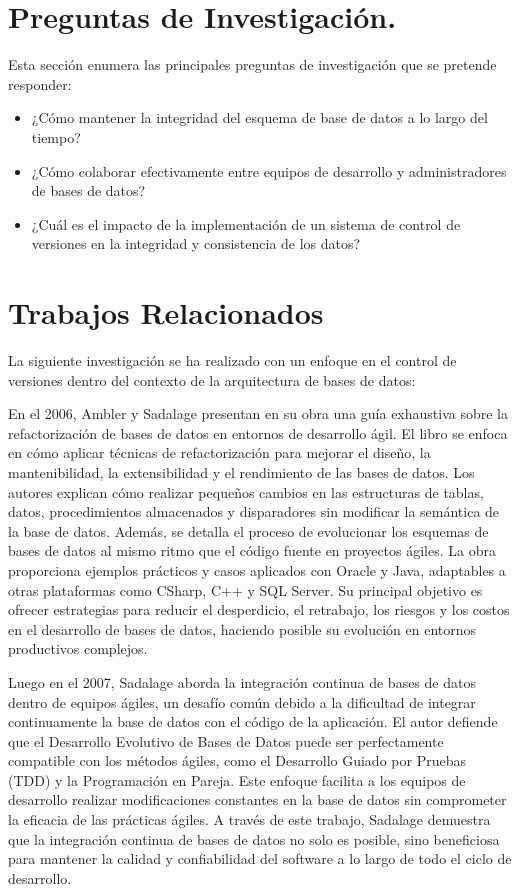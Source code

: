 \documentclass{IEEEtran}
\begin{document}
\section{Preguntas de Investigación.}
Esta sección enumera las principales preguntas de investigación que se pretende responder:
\begin{itemize}
    \item ¿Cómo mantener la integridad del esquema de base de datos a lo largo del tiempo? 
    \item ¿Cómo colaborar efectivamente entre equipos de desarrollo y administradores de bases de datos? 
    \item ¿Cuál es el impacto de la implementación de un sistema de control de versiones en la integridad y consistencia de los datos?
\end{itemize}


\section{Trabajos Relacionados}
La siguiente investigación se ha realizado con un enfoque en el control de versiones dentro del contexto de la arquitectura de bases de datos:

En el 2006, Ambler y Sadalage \cite{ambler2006refactoring} presentan en su obra una guía exhaustiva sobre la refactorización de bases de datos en entornos de desarrollo ágil. El libro se enfoca en cómo aplicar técnicas de refactorización para mejorar el diseño, la mantenibilidad, la extensibilidad y el rendimiento de las bases de datos. Los autores explican cómo realizar pequeños cambios en las estructuras de tablas, datos, procedimientos almacenados y disparadores sin modificar la semántica de la base de datos. Además, se detalla el proceso de evolucionar los esquemas de bases de datos al mismo ritmo que el código fuente en proyectos ágiles. La obra proporciona ejemplos prácticos y casos aplicados con Oracle y Java, adaptables a otras plataformas como CSharp, C++ y SQL Server. Su principal objetivo es ofrecer estrategias para reducir el desperdicio, el retrabajo, los riesgos y los costos en el desarrollo de bases de datos, haciendo posible su evolución en entornos productivos complejos.

Luego en el 2007, Sadalage \cite{sadalage2007recipes} aborda la integración continua de bases de datos dentro de equipos ágiles, un desafío común debido a la dificultad de integrar continuamente la base de datos con el código de la aplicación. El autor defiende que el Desarrollo Evolutivo de Bases de Datos puede ser perfectamente compatible con los métodos ágiles, como el Desarrollo Guiado por Pruebas (TDD) y la Programación en Pareja. Este enfoque facilita a los equipos de desarrollo realizar modificaciones constantes en la base de datos sin comprometer la eficacia de las prácticas ágiles. A través de este trabajo, Sadalage demuestra que la integración continua de bases de datos no solo es posible, sino beneficiosa para mantener la calidad y confiabilidad del software a lo largo de todo el ciclo de desarrollo.
\end{document}
